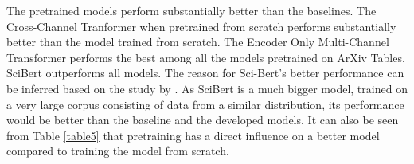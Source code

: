 The pretrained models perform substantially better than the baselines. The Cross-Channel Tranformer when pretrained from scratch performs substantially better than the model trained from scratch. The Encoder Only Multi-Channel Transformer performs the best among all the models pretrained on ArXiv Tables. SciBert outperforms all models. The reason for Sci-Bert's better performance can be inferred based on the study by \cite{hernandez2021scaling}. As SciBert is a much bigger model, trained on a very large corpus consisting of data from a similar distribution, its performance would be better than the baseline and the developed models. It can also be seen from Table \ref{table5} that pretraining has a direct influence on a better model compared to training the model from scratch. 